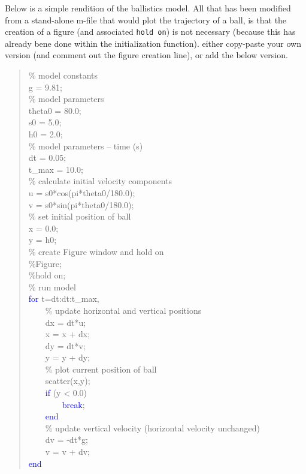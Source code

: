 \documentclass{tufte-book} %
\newenvironment{docspecmargin}{\begin{quotation}\ttfamily\footnotesize\parskip0pt\parindent0pt\ignorespaces}{\end{quotation}}
\begin{document}
Below is a simple rendition of the ballistics model. All that has been modified from a stand-alone \textsf{m-file} that would plot the trajectory of a ball, is that the creation of a figure (and associated \texttt{hold on}) is not necessary (because this has already bene done within the initialization function). either copy-paste your own version (and comment out the figure creation line), or add the below version.

\begin{docspecmargin}
\% model constants
\\g = 9.81;
\\\textcolor[rgb]{0,0.501961,0}{\% model parameters}
\\theta0 = 80.0;
\\s0 = 5.0;
\\h0 = 2.0;
\\\textcolor[rgb]{0,0.501961,0}{\% model parameters -- time (s)}
\\dt = 0.05;
\\t\_max = 10.0;
\\\textcolor[rgb]{0,0.501961,0}{\% calculate initial velocity components}
\\u = s0*cos(pi*theta0/180.0);
\\v = s0*sin(pi*theta0/180.0);
\\\textcolor[rgb]{0,0.501961,0}{\% set initial position of ball}
\\x = 0.0;
\\y = h0;
\textcolor[rgb]{0,0.501961,0}{\\\% create Figure window and hold on
\\\%Figure;
\\\%hold on;}
\\\textcolor[rgb]{0,0.501961,0}{\% run model}
\\\textcolor{blue}{for} t=dt:dt:t\_max,
\\ \ \ \ \    \textcolor[rgb]{0,0.501961,0}{\% update horizontal and vertical positions}
\\ \ \ \ \    dx = dt*u;
\\ \ \ \ \    x = x + dx;
\\ \ \ \ \    dy = dt*v;
\\ \ \ \ \    y = y + dy;
\\ \ \ \ \    \textcolor[rgb]{0,0.501961,0}{\% plot current position of ball}
\\ \ \ \ \    scatter(x,y);
\\ \ \ \ \    \textcolor{blue}{if} (y < 0.0)
\\ \ \ \ \ \ \ \ \        \textcolor{blue}{break};
\\ \ \ \ \    \textcolor{blue}{end}
\\ \ \ \ \    \textcolor[rgb]{0,0.501961,0}{\% update vertical velocity (horizontal velocity unchanged)}
\\ \ \ \ \   dv = -dt*g;
\\ \ \ \ \   v = v + dv;
\\\textcolor{blue}{end}
\end{docspecmargin}
\end{document}
